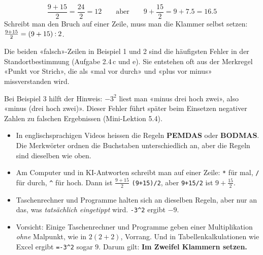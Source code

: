 \documentclass[11pt]{exam}
\begin{document}
\begin{beispiel}
\[ \frac{9 + 15}{2} = \frac{24}{2} = 12
   \qquad\text{aber}\qquad
   9 + \frac{15}{2} = 9 + 7.5 = 16.5 \]
Schreibt man den Bruch auf einer Zeile, muss man die Klammer selbst setzen:
$\frac{9 + 15}{2} = (9 + 15) \mathbin{:} 2$.
\end{beispiel}

\begin{lehrperson}[Beispiele]
Die beiden «falsch»-Zeilen in Beispiel 1 und 2 sind die häufigsten Fehler in
der Standortbestimmung (Aufgabe 2.4\,c und e). Sie entstehen oft aus der
Merkregel «Punkt vor Strich», die als «mal vor durch» und «plus vor minus»
missverstanden wird.

Bei Beispiel 3 hilft der Hinweis: $-3^2$ liest man «minus drei hoch zwei», also
«minus (drei hoch zwei)». Dieser Fehler führt später beim Einsetzen negativer
Zahlen zu falschen Ergebnissen (Mini-Lektion 5.4).
\end{lehrperson}


\begin{schreibweisen}
\begin{itemize}
  \item In englischsprachigen Videos heissen die Regeln \textbf{PEMDAS} oder
        \textbf{BODMAS}. Die Merkwörter ordnen die Buchstaben unterschiedlich
        an, aber die Regeln sind dieselben wie oben.
  \item Am Computer und in KI-Antworten schreibt man auf einer Zeile:
        \texttt{*} für mal, \texttt{/} für durch, \texttt{\^} für hoch.
        Dann ist $\frac{9+15}{2}$ \texttt{(9+15)/2}, aber \texttt{9+15/2}
        ist $9 + \frac{15}{2}$.
  \item Taschenrechner und Programme halten sich an dieselben Regeln, aber nur
        an das, was \emph{tatsächlich eingetippt} wird. \texttt{-3\^{}2} ergibt
        $-9$.
  \item Vorsicht: Einige Taschenrechner und Programme geben einer
        Multiplikation \emph{ohne} Malpunkt, wie in $2(2 + 2)$, Vorrang. Und
        in Tabellenkalkulationen wie Excel ergibt \texttt{=-3\^{}2} sogar $9$.
        Darum gilt: \textbf{Im Zweifel Klammern setzen.}
\end{itemize}
\end{schreibweisen}

\end{document}

